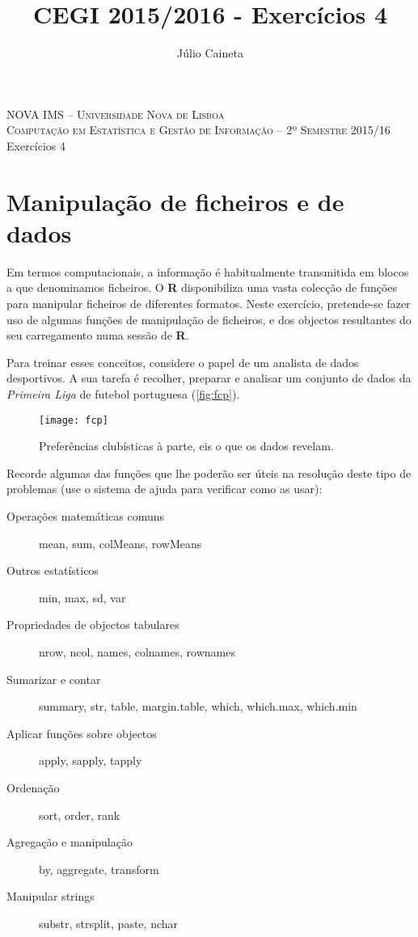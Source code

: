 \documentclass{exam}
\author{Júlio Caineta}
\title{CEGI 2015/2016 - Exercícios 4}
\begin{document}
 
\begin{center}
\textsc {\small NOVA IMS -- Universidade Nova de Lisboa} \\
\textsc {Computação em Estatística e Gestão de Informação -- 2º Semestre 2015/16}
\vspace{5mm} \\
{\large Exercícios 4}
\end{center}
 
\vspace{5mm}

\section*{Manipulação de ficheiros e de dados}

Em termos computacionais, a informação é habitualmente transmitida em blocos a que denominamos ficheiros. O \textbf{R} disponibiliza uma vasta colecção de funções para manipular ficheiros de diferentes formatos. Neste exercício, pretende-se fazer uso de algumas funções de manipulação de ficheiros, e dos objectos resultantes do seu carregamento numa sessão de \textbf{R}.

Para treinar esses conceitos, considere o papel de um analista de dados desportivos. A sua tarefa é recolher, preparar e analisar um conjunto de dados da \textit{Primeira Liga} de futebol portuguesa (\autoref{fig:fcp}).

\begin{figure}[h]
	\centering
	\texttt{[image: fcp]}
	\caption{Preferências clubísticas à parte, eis o que os dados revelam.}
	\label{fig:fcp}
\end{figure}

Recorde algumas das funções que lhe poderão ser úteis na resolução deste tipo de problemas (use o sistema de ajuda para verificar como as usar):

\begin{description}
	\item[Operações matemáticas comuns] mean, sum, colMeans, rowMeans
	\item[Outros estatísticos] min, max, sd, var
	\item[Propriedades de objectos tabulares] nrow, ncol, names, colnames, rownames
	\item[Sumarizar e contar] summary, str, table, margin.table, which, which.max, which.min
	\item[Aplicar funções sobre objectos] apply, sapply, tapply
	\item[Ordenação] sort, order, rank
	\item[Agregação e manipulação] by, aggregate, transform
	\item[Manipular strings] substr, strsplit, paste, nchar
\end{description}
\end{document}
